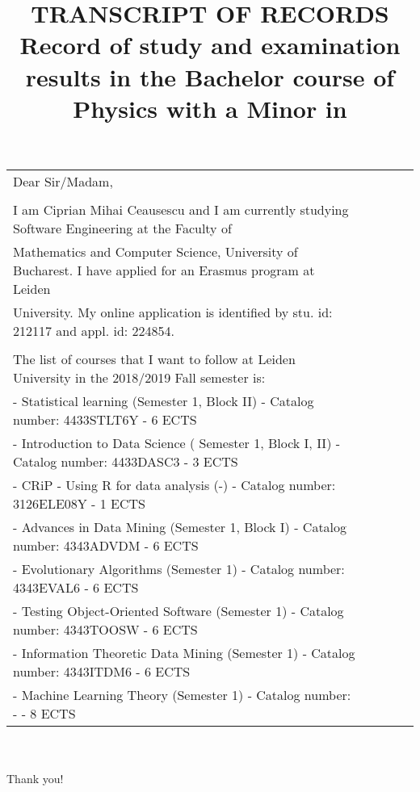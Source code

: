 \documentclass[a4paper,9pt,final]{scrartcl}
\title{\textbf{TRANSCRIPT OF RECORDS}\\[0.5em]
Record of study and examination results in the
Bachelor course of Physics
with a Minor in \ergfach}
\author{}
\begin{document}


\begin{tabular}{llcll}
\hspace{3em}
Dear Sir/Madam,\\
\vspace{3em}
\\
\hspace{3em} I am Ciprian Mihai Ceausescu and I am currently studying Software Engineering at the Faculty of \\ Mathematics and Computer Science, University of Bucharest.
I have applied for an Erasmus program at Leiden \\ University.  My online application is identified by stu. id: 212117 and appl. id: 224854. \\
\vspace{3em}
\\
\hspace{3em} The list of courses that I want to follow at Leiden University in the 2018/2019 Fall semester is:\\
\hspace{3em} - Statistical learning (Semester 1, Block II) - Catalog number: 4433STLT6Y - 6 ECTS\\
\hspace{3em} - Introduction to Data Science (	Semester 1, Block I, II) -  Catalog number: 4433DASC3 - 3 ECTS\\
\hspace{3em} - CRiP - Using R for data analysis (-) -  Catalog number: 3126ELE08Y - 1 ECTS\\
\hspace{3em} - Advances in Data Mining (Semester 1, Block I) -  Catalog number: 4343ADVDM - 6 ECTS\\
\hspace{3em} - Evolutionary Algorithms (Semester 1) -  Catalog number: 4343EVAL6 - 6 ECTS\\
\hspace{3em} - Testing Object-Oriented Software (Semester 1) -  Catalog number: 4343TOOSW - 6 ECTS\\
\hspace{3em} - Information Theoretic Data Mining (Semester 1) -  Catalog number: 4343ITDM6 - 6 ECTS\\
\hspace{3em} - Machine Learning Theory (Semester 1) -  Catalog number: - - 8 ECTS\\
\end{tabular}
\\
\vspace{3em}
\\
\hspace{3em}Thank you!
	
\end{document}
